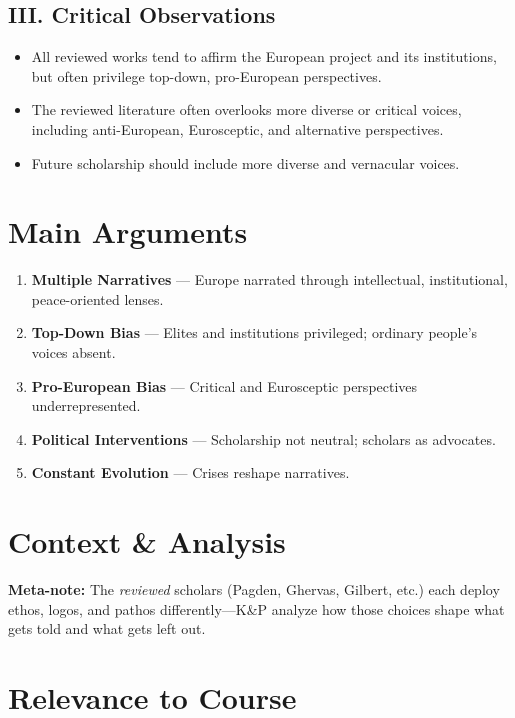 \documentclass[11pt,a4paper]{article}
\begin{document}
\subsection*{III. Critical Observations}

\begin{itemize}
\item All reviewed works tend to affirm the European project and its institutions, but often privilege top-down, pro-European perspectives.
\item The reviewed literature often overlooks more diverse or critical voices, including anti-European, Eurosceptic, and alternative perspectives.
\item Future scholarship should include more diverse and vernacular voices.
\end{itemize}

\section*{Main Arguments}

\begin{enumerate}
\item \textbf{Multiple Narratives} --- Europe narrated through intellectual, institutional, peace-oriented lenses.
\item \textbf{Top-Down Bias} --- Elites and institutions privileged; ordinary people's voices absent.
\item \textbf{Pro-European Bias} --- Critical and Eurosceptic perspectives underrepresented.
\item \textbf{Political Interventions} --- Scholarship not neutral; scholars as advocates.
\item \textbf{Constant Evolution} --- Crises reshape narratives.
\end{enumerate}

\section*{Context \& Analysis}

\textbf{Meta-note:} The \textit{reviewed} scholars (Pagden, Ghervas, Gilbert, etc.) each deploy ethos, logos, and pathos differently---K\&P analyze how those choices shape what gets told and what gets left out.

\section*{Relevance to Course}
\end{document}
